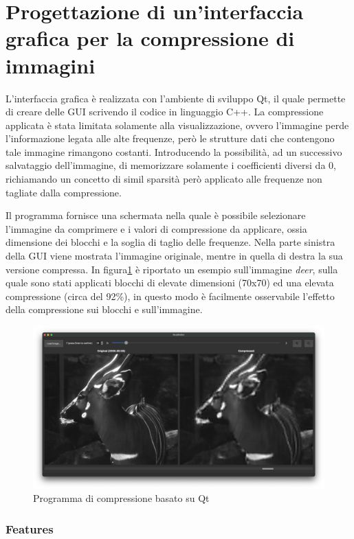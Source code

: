 \part{Progettazione di un'interfaccia grafica per la compressione di immagini}

L'interfaccia grafica è realizzata con l'ambiente di sviluppo Qt\cite{qt}, il quale permette di creare delle GUI scrivendo il codice in linguaggio C++. La compressione applicata è stata limitata solamente alla visualizzazione, ovvero l'immagine perde l'informazione legata alle alte frequenze, però le strutture dati che contengono tale immagine rimangono costanti. Introducendo la possibilità, ad un successivo salvataggio dell'immagine, di memorizzare solamente i coefficienti diversi da 0, richiamando un concetto di simil sparsità però applicato alle frequenze non tagliate dalla compressione.

Il programma fornisce una schermata nella quale è possibile selezionare l'immagine da comprimere e i valori di compressione da applicare, ossia dimensione dei blocchi e la soglia di taglio delle frequenze. Nella parte sinistra della GUI viene mostrata l'immagine originale, mentre in quella di destra la sua versione compressa. In figura\ref{fig:deer} è riportato un esempio sull'immagine \textit{deer}, sulla quale sono stati applicati blocchi di elevate dimensioni (70x70) ed una elevata compressione (circa del 92\%), in questo modo è facilmente osservabile l'effetto della compressione sui blocchi e sull'immagine.

\begin{figure}[h]
	\centering
	\includegraphics[width=1\linewidth]{figures/qt_deer}
	\caption{Programma di compressione basato su Qt}
	\label{fig:deer}
\end{figure}

\section{Features}

